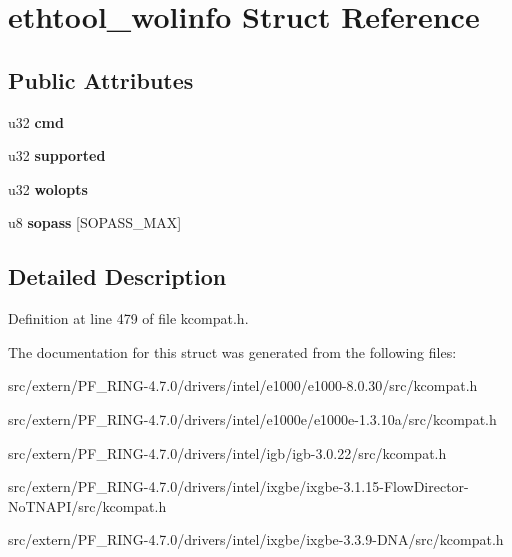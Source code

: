 \hypertarget{structethtool__wolinfo}{
\section{ethtool\_\-wolinfo Struct Reference}
\label{structethtool__wolinfo}
}
\subsection*{Public Attributes}
\begin{DoxyCompactItemize}
\item 
\hypertarget{structethtool__wolinfo_a4eaf97e23c5fe9f98fc967fbae2edfd1}{
u32 {\bfseries cmd}}
\label{structethtool__wolinfo_a4eaf97e23c5fe9f98fc967fbae2edfd1}

\item 
\hypertarget{structethtool__wolinfo_a08995246f73212b3d04d19fcb3ebec1d}{
u32 {\bfseries supported}}
\label{structethtool__wolinfo_a08995246f73212b3d04d19fcb3ebec1d}

\item 
\hypertarget{structethtool__wolinfo_a1d9a7ed31de2ea47220b904a8725a99c}{
u32 {\bfseries wolopts}}
\label{structethtool__wolinfo_a1d9a7ed31de2ea47220b904a8725a99c}

\item 
\hypertarget{structethtool__wolinfo_a2c23a9d9e87352bc3d09a3d1926cb026}{
u8 {\bfseries sopass} \mbox{[}SOPASS\_\-MAX\mbox{]}}
\label{structethtool__wolinfo_a2c23a9d9e87352bc3d09a3d1926cb026}

\end{DoxyCompactItemize}


\subsection{Detailed Description}


Definition at line 479 of file kcompat.h.



The documentation for this struct was generated from the following files:\begin{DoxyCompactItemize}
\item 
src/extern/PF\_\-RING-\/4.7.0/drivers/intel/e1000/e1000-\/8.0.30/src/kcompat.h\item 
src/extern/PF\_\-RING-\/4.7.0/drivers/intel/e1000e/e1000e-\/1.3.10a/src/kcompat.h\item 
src/extern/PF\_\-RING-\/4.7.0/drivers/intel/igb/igb-\/3.0.22/src/kcompat.h\item 
src/extern/PF\_\-RING-\/4.7.0/drivers/intel/ixgbe/ixgbe-\/3.1.15-\/FlowDirector-\/NoTNAPI/src/kcompat.h\item 
src/extern/PF\_\-RING-\/4.7.0/drivers/intel/ixgbe/ixgbe-\/3.3.9-\/DNA/src/kcompat.h\end{DoxyCompactItemize}
